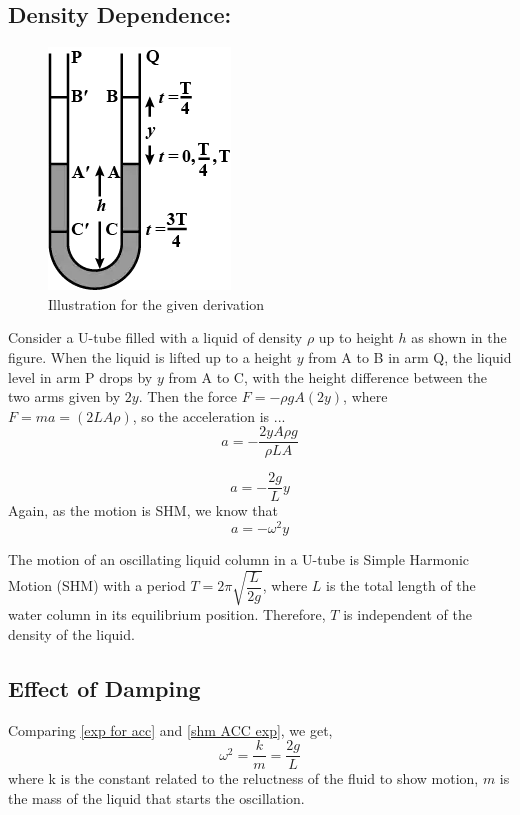 \documentclass[twocolumn,11pt]{article}
\begin{document}
\subsection{Density Dependence:}
\begin{figure}[h]
    \centering
    \includegraphics[scale=0.7]{SHM_no_density.png}
    \caption{Illustration for the given derivation}
    \label{fig:enter-label}
\end{figure}

Consider a U-tube filled with a liquid of density $\rho$ up to height $h$ as shown in the figure. When the liquid is lifted up to a height $y$ from A to B in arm Q, the liquid level in arm P drops by $y$ from A to C, with the height difference between the two arms given by $2y$. Then the force $F = -\rho gA(2y)$, where $F=ma=(2LA\rho)$, so the acceleration is ...
$$a =- \frac{2yA\rho g}{\rho LA}$$

\begin{equation}
    \label{exp for acc}
    a= -\frac{2g}{L}y
\end{equation}
Again, as the motion is SHM, we know that
\begin{equation}
    \label{shm ACC exp}
    a = - \omega^2 y
\end{equation}

The motion of an oscillating liquid column in a U-tube is Simple Harmonic Motion (SHM) with a period $T = 2\pi \sqrt{\dfrac{L}{2g}}$, where $L$ is the total length of the water column in its equilibrium position. Therefore, $T$ is independent of the density of the liquid.

\subsection{Effect of Damping}
Comparing \eqref{exp for acc} and \eqref{shm ACC exp}, we get,
\begin{equation}
    \label{omegha}
    \omega^2 = \frac{k}{m} = \frac{2g}{L}
\end{equation}
where k is the constant related to the reluctness of the fluid to show motion, $m$ is the mass of the liquid that starts the oscillation.
\end{document}
